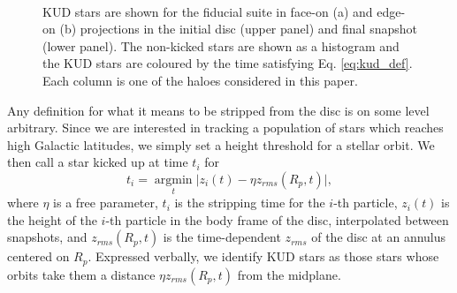 \begin{figure}
    \centering
  	\\
	 \caption{KUD stars are shown for the fiducial suite in face-on (a) and edge-on (b) projections in the initial disc (upper panel) and final snapshot (lower panel). The non-kicked stars are shown as a histogram and the KUD stars are coloured by the time satisfying Eq. \ref{eq:kud_def}. Each column is one of the haloes considered in this paper.}
	\label{fig:kud_stars_final_ics}
\end{figure}
Any definition for what it means to be stripped from the disc is on some level arbitrary. Since we are interested in tracking a population of stars which reaches high Galactic latitudes, we simply set a height threshold for a stellar orbit. We then call a star kicked up at time $t_i$ for
\begin{equation}
t_{i} = \underset{t}{\operatorname{argmin}} \vert z_i(t) - \eta z_{rms}(R_p,t) \vert, \label{eq:kud_def}
\end{equation}
where $\eta$ is a free parameter, $t_{i}$ is the stripping time for the $i$-th particle, $z_i(t)$ is the height of the $i$-th particle in the body frame of the disc, interpolated between snapshots, and $z_{rms}(R_p,t)$ is the time-dependent $z_{rms}$ of the disc at an annulus centered on $R_p$. Expressed verbally, we identify KUD stars as those stars whose orbits take them a distance $\eta z_{rms}(R_p,t)$ from the midplane.


